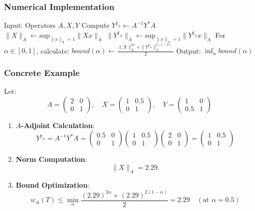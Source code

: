 \documentclass{article}
\begin{document}
\subsubsection{Numerical Implementation}
\begin{algorithm}
\caption{Compute $w_A(T)$ Bound for Hybrid Systems}
\begin{algorithmic}[1]
\State Input: Operators $A, X, Y$
\State Compute $Y^{\sharp_A} \gets A^{-1}Y^*A$
\State $\|X\|_A \gets \text{sup}_{\|x\|_A=1} \|Xx\|_A$
\State $\|Y^{\sharp_A}\|_A \gets \text{sup}_{\|x\|_A=1} \|Y^{\sharp_A}x\|_A$
\State For $\alpha \in [0,1]$, calculate:
\State \quad $bound(\alpha) \gets \frac{\|X\|_A^{2\alpha} + \|Y^{\sharp_A}\|_A^{2(1-\alpha)}}{2}$
\State Output: $\inf_\alpha bound(\alpha)$
\end{algorithmic}
\end{algorithm}

\subsubsection{Concrete Example}
Let:
\[
A = \begin{pmatrix} 2 & 0 \\ 0 & 1 \end{pmatrix}, \quad
X = \begin{pmatrix} 1 & 0.5 \\ 0 & 1 \end{pmatrix}, \quad
Y = \begin{pmatrix} 1 & 0 \\ 0.5 & 1 \end{pmatrix}
\]
\begin{enumerate}
\item \textbf{$A$-Adjoint Calculation}:
\[
Y^{\sharp_A} = A^{-1}Y^*A = \begin{pmatrix} 0.5 & 0 \\ 0 & 1 \end{pmatrix}
\begin{pmatrix} 1 & 0.5 \\ 0 & 1 \end{pmatrix}
\begin{pmatrix} 2 & 0 \\ 0 & 1 \end{pmatrix} = \begin{pmatrix} 1 & 0.5 \\ 0 & 1 \end{pmatrix}
\]
\item \textbf{Norm Computation}:
\[
\|X\|_A= 2.29.
\]
\item \textbf{Bound Optimization}:
\[
w_A(T) \leq \min_{\alpha} \frac{(2.29)^{2\alpha} + (2.29)^{2(1-\alpha)}}{2} =2.29 \quad (\text{at } \alpha=0.5)
\]
\end{enumerate}
\end{document}
